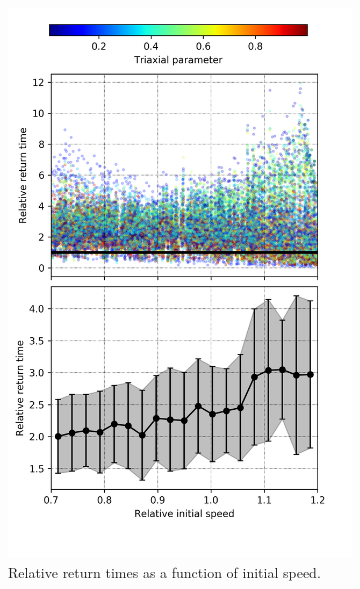 	\begin{figure}[h!]
		\centering
		\begin{subfigure}[b]{0.49\textwidth}
			\includegraphics[width = \textwidth]{"../Files/Week 14/relative_times"}
			\caption{Relative return times as a function of initial speed.}
			\label{fig: relTime}
		\end{subfigure}
		~ 
		\begin{subfigure}[b]{0.49\textwidth}

\end{subfigure}
\end{figure}
